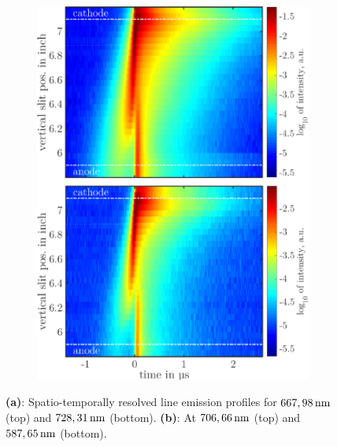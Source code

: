 \documentclass[a4paper,10pt,twoside]{article}
\newcommand{\fett}[1]{\textbf{#1}}
\begin{document}
\begin{figure}
\begin{subfigure}[t]{0.49\textwidth}
					\includegraphics[width=\textwidth]{figures/lineratio/combinations/korr706over587.pdf}
					\caption{}
					\label{img:706u587nm}
				\end{subfigure}
				\vspace{0.3cm}
				\caption{\fett{(a)}: Spatio-temporally resolved line emission profiles for $\unit[667,98]{nm}$ (top) and $\unit[728,31]{nm}$ (bottom). \fett{(b)}: At $\unit[706,66]{nm}$ (top) and $\unit[587,65]{nm}$ (bottom).}
				\label{img:comparisonemissionline}
			\end{figure}
			
		\begin{multicols*}{2}
			
		\end{multicols*}
			
			\twocolumn
		
\end{document}
